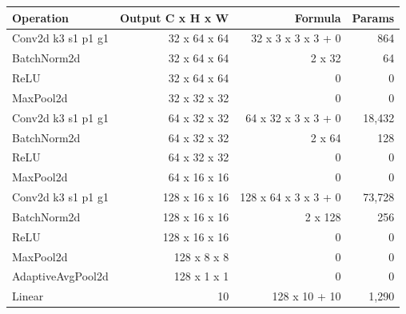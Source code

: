 \begin{tabular}{lrrr}
\toprule
Operation & Output C x H x W & Formula & Params \\
\midrule
Conv2d k3 s1 p1 g1 & 32 x 64 x 64 & 32 x 3 x 3 x 3 + 0 & 864 \\
BatchNorm2d & 32 x 64 x 64 & 2 x 32 & 64 \\
ReLU & 32 x 64 x 64 & 0 & 0 \\
MaxPool2d & 32 x 32 x 32 & 0 & 0 \\
Conv2d k3 s1 p1 g1 & 64 x 32 x 32 & 64 x 32 x 3 x 3 + 0 & 18,432 \\
BatchNorm2d & 64 x 32 x 32 & 2 x 64 & 128 \\
ReLU & 64 x 32 x 32 & 0 & 0 \\
MaxPool2d & 64 x 16 x 16 & 0 & 0 \\
Conv2d k3 s1 p1 g1 & 128 x 16 x 16 & 128 x 64 x 3 x 3 + 0 & 73,728 \\
BatchNorm2d & 128 x 16 x 16 & 2 x 128 & 256 \\
ReLU & 128 x 16 x 16 & 0 & 0 \\
MaxPool2d & 128 x 8 x 8 & 0 & 0 \\
AdaptiveAvgPool2d & 128 x 1 x 1 & 0 & 0 \\
Linear & 10 & 128 x 10 + 10 & 1,290 \\
\bottomrule
\end{tabular}
